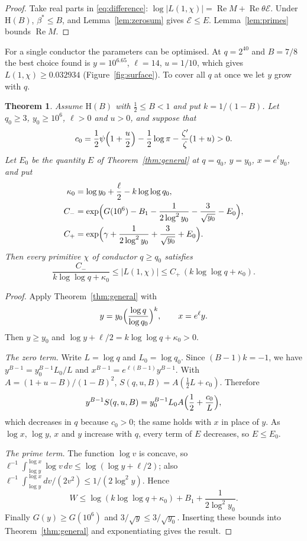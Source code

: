 \documentclass[11pt]{amsart}
\newtheorem{theorem}{Theorem}[section]
\theoremstyle{definition}
\theoremstyle{remark}
\renewcommand{\Re}{\operatorname{Re}}
\begin{document}
\begin{proof}
Take real parts in \eqref{eq:difference}: $\log|L(1,\chi)|=\Re M+\Re\theta\mathcal E$. Under $\mathrm H(B)$, $\beta^*\le B$, and Lemma~\ref{lem:zerosum} gives $\mathcal E\le E$. Lemma~\ref{lem:primes} bounds $\Re M$.
\end{proof}

For a single conductor the parameters can be optimised. At $q=2^{40}$ and $B=7/8$ the best choice found is $y=10^{6.65}$, $\ell=14$, $u=1/10$, which gives $L(1,\chi)\ge0.032934$ (Figure~\ref{fig:surface}). To cover all $q$ at once we let $y$ grow with $q$.

\begin{theorem}\label{thm:uniform}
Assume $\mathrm H(B)$ with $\tfrac12\le B<1$ and put $k=1/(1-B)$. Let $q_0\ge3$, $y_0\ge10^6$, $\ell>0$ and $u>0$, and suppose that
\[
c_0=\frac12\psi\Bigl(1+\frac u2\Bigr)-\frac12\log\pi-\frac{\zeta'}{\zeta}(1+u)>0 .
\]
Let $E_0$ be the quantity $E$ of Theorem~\ref{thm:general} at $q=q_0$, $y=y_0$, $x=e^\ell y_0$, and put
\begin{align*}
\kappa_0&=\log y_0+\frac\ell2-k\log\log q_0,\\
C_-&=\exp\Bigl(G(10^6)-B_1-\frac{1}{2\log^2y_0}-\frac3{\sqrt{y_0}}-E_0\Bigr),\\
C_+&=\exp\Bigl(\gamma+\frac{1}{2\log^2y_0}+\frac3{\sqrt{y_0}}+E_0\Bigr).
\end{align*}
Then every primitive $\chi$ of conductor $q\ge q_0$ satisfies
\[
\frac{C_-}{k\log\log q+\kappa_0}\le|L(1,\chi)|\le C_+\,(k\log\log q+\kappa_0).
\]
\end{theorem}

\begin{proof}
Apply Theorem~\ref{thm:general} with
\[
y=y_0\Bigl(\frac{\log q}{\log q_0}\Bigr)^{k},\qquad x=e^\ell y .
\]
Then $y\ge y_0$ and $\log y+\ell/2=k\log\log q+\kappa_0>0$.

\emph{The zero term.} Write $L=\log q$ and $L_0=\log q_0$. Since $(B-1)k=-1$, we have $y^{B-1}=y_0^{B-1}L_0/L$ and $x^{B-1}=e^{\ell(B-1)}y^{B-1}$. With $A=(1+u-B)/(1-B)^2$, $S(q,u,B)=A(\tfrac12L+c_0)$. Therefore
\[
y^{B-1}S(q,u,B)=y_0^{B-1}L_0A\Bigl(\frac12+\frac{c_0}{L}\Bigr),
\]
which decreases in $q$ because $c_0>0$; the same holds with $x$ in place of $y$. As $\log x$, $\log y$, $x$ and $y$ increase with $q$, every term of $E$ decreases, so $E\le E_0$.

\emph{The prime term.} The function $\log v$ is concave, so $\ell^{-1}\int_{\log y}^{\log x}\log v\,dv\le\log(\log y+\ell/2)$; also $\ell^{-1}\int_{\log y}^{\log x}dv/(2v^2)\le1/(2\log^2y)$. Hence
\[
W\le\log(k\log\log q+\kappa_0)+B_1+\frac1{2\log^2y_0}.
\]
Finally $G(y)\ge G(10^6)$ and $3/\sqrt y\le3/\sqrt{y_0}$. Inserting these bounds into Theorem~\ref{thm:general} and exponentiating gives the result.
\end{proof}
\end{document}
